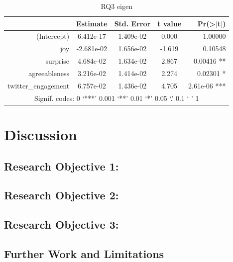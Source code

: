 \documentclass[bsc,frontabs,twoside,singlespacing,parskip,deptreport]{infthesis}
\begin{document}
\begin{table}[]
\centering
\caption{RQ3 eigen}
\begin{tabular}{rcccr}
\hline
                    & Estimate  & Std. Error     & t value & Pr(\textgreater{}$\rvert$t$\rvert$) \\ \hline
(Intercept)         & 6.412e-17     & 1.409e-02 & 0.000   & 1.00000                             \\
joy                 & -2.681e-02    & 1.656e-02 & -1.619  & 0.10548                             \\
surprise            & 4.684e-02     & 1.634e-02 & 2.867   & 0.00416 **                          \\
agreeableness       & 3.216e-02     & 1.414e-02 & 2.274   & 0.02301 *                           \\
twitter\_engagement & 6.757e-02     & 1.436e-02 & 4.705   & 2.61e-06 ***                        \\ \hline
\multicolumn{5}{c}{Signif. codes:  0 ‘***’ 0.001 ‘**’ 0.01 ‘*’ 0.05 ‘.’ 0.1 ‘ ’ 1}              \\ \hline
\end{tabular}
\end{table}

\chapter{Discussion}\label{discussion}

\section{Research Objective 1:}\label{rq1}

\section{Research Objective 2:}\label{rq2}

\section{Research Objective 3:}\label{rq3}

\section{Further Work and Limitations}\label{further-work}

\end{document}
